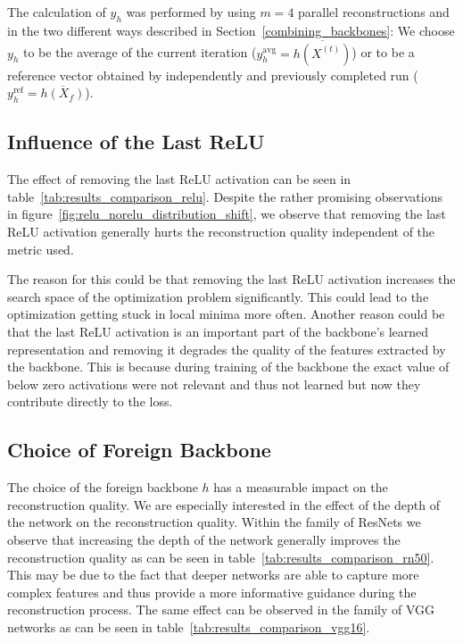 \documentclass[10pt,twocolumn]{article}
\begin{document}
The calculation of $y_h$ was performed by using $m=4$ parallel reconstructions and in the two different ways described in Section~\ref{combining_backbones}:
We choose $y_h$ to be the average of the current iteration ($y_h^\text{avg}=\overline{h(X^{(t)})}$) or to be a reference vector obtained by independently and previously completed run ($y_h^\text{ref}=\overline{h(X_f)}$).
\subsection{Influence of the Last ReLU}
The effect of removing the last ReLU activation can be seen in table~\ref{tab:results_comparison_relu}.
Despite the rather promising observations in figure~\ref{fig:relu_norelu_distribution_shift}, we observe that removing the last ReLU activation generally hurts the reconstruction quality independent of the metric used.

The reason for this could be that removing the last ReLU activation increases the search space of the optimization problem significantly.
This could lead to the optimization getting stuck in local minima more often.
Another reason could be that the last ReLU activation is an important part of the backbone's learned representation and removing it degrades the quality of the features extracted by the backbone.
This is because during training of the backbone the exact value of below zero activations were not relevant and thus not learned but now they contribute directly to the loss.

\subsection{Choice of Foreign Backbone}
The choice of the foreign backbone $h$ has a measurable impact on the reconstruction quality.
We are especially interested in the effect of the depth of the network on the reconstruction quality.
Within the family of ResNets we observe that increasing the depth of the network generally improves the reconstruction quality as can be seen in table~\ref{tab:results_comparison_rn50}.
This may be due to the fact that deeper networks are able to capture more complex features and thus provide a more informative guidance during the reconstruction process.
The same effect can be observed in the family of VGG networks as can be seen in table~\ref{tab:results_comparison_vgg16}.
\end{document}

